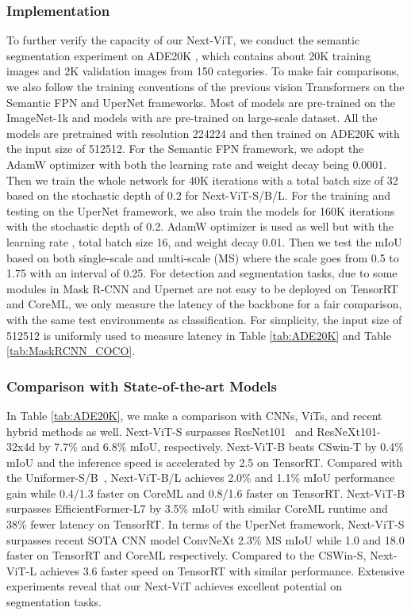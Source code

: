 \documentclass[10pt,twocolumn,letterpaper]{article}
\begin{document}
\subsubsection{Implementation} 
To further verify the capacity of our Next-ViT, we conduct the semantic segmentation experiment on ADE20K \cite{ADE20K}, which contains about 20K training images and 2K validation images from 150 categories.
To make fair comparisons, we also follow the training conventions of the previous vision Transformers \cite{PVT_v1,Swin,Twins} on the Semantic FPN \cite{Semantic_FPN} and UperNet \cite{UperNet} frameworks. Most of models are pre-trained on the ImageNet-1k and models with  are pre-trained on large-scale dataset. All the models are pretrained with resolution 224224 and then trained on ADE20K with the input size of 512512. For the Semantic FPN framework, we adopt the AdamW optimizer with both the learning rate and weight decay being 0.0001. Then we train the whole network for 40K iterations with a total batch size of 32 based on the stochastic depth of 0.2 for Next-ViT-S/B/L.
For the training and testing on the UperNet framework, we also train the models for 160K iterations with the stochastic depth of 0.2. AdamW optimizer is used as well but with the learning rate , total batch size 16, and weight decay 0.01. Then we test the mIoU based on both single-scale and multi-scale (MS) where the scale goes from 0.5 to 1.75 with an interval of 0.25. For detection and segmentation tasks, due to some modules in Mask R-CNN  and Upernet are not easy to be deployed on TensorRT and CoreML, we only measure the latency of the backbone for a fair comparison, with the same test environments as classification.  For simplicity, the input size of 512512 is uniformly  used to measure latency in Table \ref{tab:ADE20K} and Table \ref{tab:MaskRCNN_COCO}. 


\subsubsection{Comparison with State-of-the-art Models} 
In Table \ref{tab:ADE20K}, we make a comparison with CNNs, ViTs, and recent hybrid methods as well. Next-ViT-S surpasses ResNet101~\cite{ResNet} and ResNeXt101-32x4d\cite{ResNeXt} by 7.7\% and 6.8\% mIoU, respectively. Next-ViT-B beats CSwin-T by 0.4\% mIoU and the inference speed is accelerated by 2.5 on TensorRT. Compared with the Uniformer-S/B~\cite{uniformer}, Next-ViT-B/L achieves 2.0\% and 1.1\% mIoU performance gain while 0.4/1.3 faster on CoreML and 0.8/1.6 faster on TensorRT. Next-ViT-B surpasses EfficientFormer-L7 \cite{li2022efficientformer} by 3.5\% mIoU with similar CoreML runtime and 38\% fewer latency on TensorRT.
In terms of the UperNet \cite{UperNet} framework, Next-ViT-S surpasses recent SOTA CNN model ConvNeXt\cite{ConvNext} 2.3\% MS mIoU while 1.0 and 18.0 faster on TensorRT and CoreML respectively. Compared to the CSWin-S\cite{CSWin}, Next-ViT-L achieves 3.6 faster speed on TensorRT with similar performance.
Extensive experiments reveal that our Next-ViT achieves excellent potential on segmentation tasks.
\end{document}
